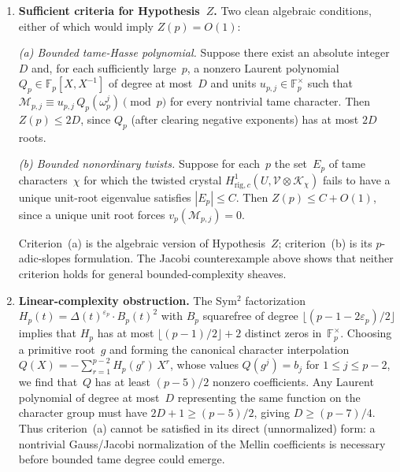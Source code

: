 \documentclass[11pt]{article}
\theoremstyle{definition}
\theoremstyle{remark}
\begin{document}
\begin{enumerate}
\item \textbf{Sufficient criteria for Hypothesis~$Z$.}
Two clean algebraic conditions, either of which
would imply $Z(p) = O(1)$:

\emph{(a) Bounded tame-Hasse polynomial.}
Suppose there exist an absolute integer $D$
and, for each sufficiently large~$p$,
a nonzero Laurent polynomial
$Q_p \in \mathbb{F}_p[X, X^{-1}]$
of degree at most~$D$ and units
$u_{p,j} \in \mathbb{F}_p^\times$ such that
$\mathscr{M}_{p,j} \equiv u_{p,j}\, Q_p(\omega_p^j)
\pmod{p}$ for every nontrivial tame character.
Then $Z(p) \le 2D$, since $Q_p$
(after clearing negative exponents)
has at most $2D$ roots.

\emph{(b) Bounded nonordinary twists.}
Suppose for each~$p$ the set~$E_p$
of tame characters~$\chi$ for which
the twisted crystal
$H^1_{\mathrm{rig},c}(U, \mathcal{V}
\otimes \mathcal{K}_\chi)$
fails to have a unique unit-root eigenvalue
satisfies $|E_p| \le C$.
Then $Z(p) \le C + O(1)$,
since a unique unit root forces
$v_p(\mathscr{M}_{p,j}) = 0$.

Criterion~(a) is the algebraic version of
Hypothesis~$Z$; criterion~(b) is its
$p$-adic-slopes formulation.
The Jacobi counterexample above shows that
neither criterion holds for general
bounded-complexity sheaves.

\item \textbf{Linear-complexity obstruction.}
The Sym$^2$ factorization
$H_p(t) = \Delta(t)^{\varepsilon_p}\cdot B_p(t)^2$
with $B_p$ squarefree of degree
$\lfloor(p{-}1{-}2\varepsilon_p)/2\rfloor$
implies that $H_p$ has at most
$\lfloor(p{-}1)/2\rfloor + 2$ distinct zeros
in~$\mathbb{F}_p^\times$.
Choosing a primitive root~$g$ and forming the
canonical character interpolation
$Q(X) = -\sum_{r=1}^{p-2} H_p(g^r)\, X^r$,
whose values $Q(g^j) = b_j$
for $1 \le j \le p{-}2$, we find that~$Q$
has at least $(p{-}5)/2$ nonzero coefficients.
Any Laurent polynomial of degree at most~$D$
representing the same function on the character
group must have $2D + 1 \ge (p{-}5)/2$,
giving $D \ge (p{-}7)/4$.
Thus criterion~(a) cannot be satisfied
in its direct (unnormalized) form:
a nontrivial Gauss/Jacobi normalization
of the Mellin coefficients is necessary
before bounded tame degree could emerge.


\end{enumerate}
\end{document}
